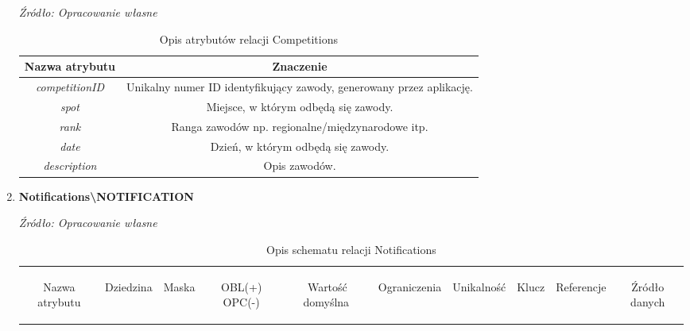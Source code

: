\documentclass[12pt,oneside]{report}
\begin{document}
\begin{enumerate}[start=1,label={\bfseries REL\textbackslash0\arabic*}]
\begin{table}[H]
	\caption{Opis atrybutów relacji Competitions}
	\textit{Źródło: Opracowanie własne}
	\label{CompetitionsAttributeDescription}
	\centering
	\begin{tabular}{|c|c|}
		\hline
		Nazwa atrybutu & Znaczenie \\
		\hline
		\textit{competitionID} & Unikalny numer ID identyfikujący zawody, generowany przez aplikację.\\
\hline
\textit{spot} & Miejsce, w którym odbędą się zawody.\\
\hline
\textit{rank} & Ranga zawodów np. regionalne/międzynarodowe itp.\\
\hline
\textit{date} & Dzień, w którym odbędą się zawody.\\
\hline
\textit{description}  & Opis zawodów.\\
\hline	
	\end{tabular}
\end{table}
\item \textbf{Notifications\textbackslash NOTIFICATION}
\begin{table}[H]
	\caption{Opis schematu relacji Notifications}
	\textit{Źródło: Opracowanie własne}
	\label{NotificationsRelationSchema}
	\centering
	\begin{tabular}{|c|c|c|c|c|c|c|c|c|c|}
		\hline
		\begin{sideways}Nazwa atrybutu\end{sideways}& 
		\begin{sideways}Dziedzina \end{sideways}& 
		\begin{sideways}Maska \end{sideways}& 
		\begin{sideways}OBL(+) OPC(-)\end{sideways} & 
		\begin{sideways}Wartość domyślna$\ $\end{sideways}& 
		\begin{sideways}Ograniczenia\end{sideways} &
		\begin{sideways}Unikalność \end{sideways}& 
		\begin{sideways}Klucz \end{sideways}& 
		\begin{sideways}Referencje \end{sideways}&
		\begin{sideways}Źródło danych\end{sideways}\\

\end{tabular}
\end{table}
\end{enumerate}
\end{document}
